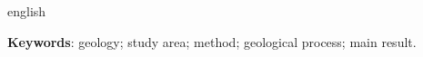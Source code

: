 \begin{resumo}[Abstract]
\SingleSpacing
\begin{otherlanguage*}{english}

\vspace{\onelineskip}
\noindent\textbf{Keywords}: geology; study area; method; geological process; main result.
\end{otherlanguage*}
\end{resumo}
